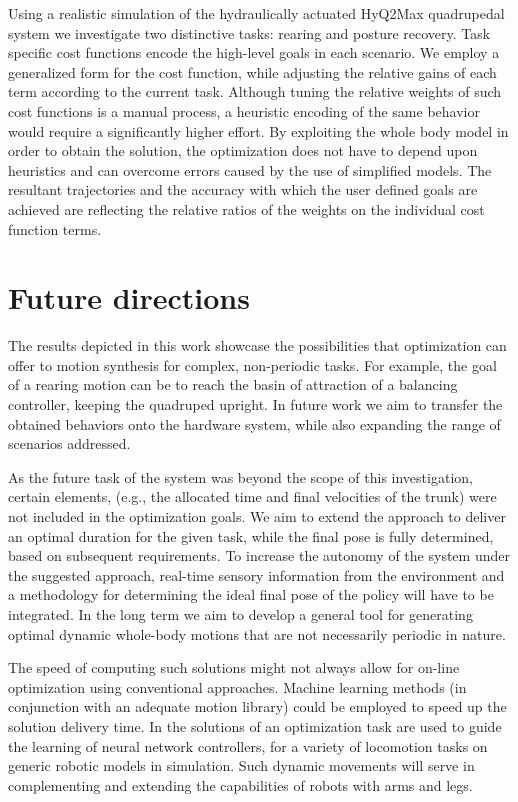 \documentclass[usletter, 10pt, conference]{ieeeconf}      %
\begin{document}
Using a realistic simulation of the hydraulically actuated HyQ2Max quadrupedal system 
we investigate two distinctive tasks: rearing and posture recovery. Task specific
cost functions encode the high-level goals in each scenario. We employ a
generalized form for the cost function, while adjusting the relative gains of each term 
according to the current task. Although tuning the relative weights of such cost functions is a manual 
process, a heuristic encoding of the same behavior would require a significantly higher effort.
By exploiting the whole body model in order to obtain the solution, the optimization does not have
to depend upon heuristics and can overcome errors caused by the use of simplified models.
The resultant trajectories and the accuracy with which the user defined goals are achieved are 
reflecting the relative ratios of the weights on the individual cost function terms. 

\section{Future directions}

The results depicted in this work showcase the possibilities that optimization 
can offer to motion synthesis for complex, non-periodic tasks. For example, the goal of a rearing 
motion can be to reach the basin of attraction of a balancing controller, 
keeping the quadruped upright. In future work we aim to transfer the obtained 
behaviors onto the hardware system, while also expanding the 
range of scenarios addressed.

As the future task of the system was beyond the scope of this investigation, certain elements,
(e.g., the allocated time and final velocities of the trunk) were not included in the
optimization goals. We aim to extend the approach to deliver an
optimal duration for the given task, while the final pose is fully determined, based on
subsequent requirements. To increase the autonomy of the system under the suggested approach, real-time 
sensory information from the environment and a methodology for determining 
the ideal final pose of the policy will have to be integrated. 
In the long term we aim to develop a general tool for generating optimal dynamic 
whole-body motions that are not necessarily periodic in nature.

The speed of computing such solutions might not always allow for on-line
optimization using conventional approaches. Machine learning methods (in conjunction with an adequate motion library)
could be employed to speed up the solution delivery time. 
In \cite{mordatch2014combining} the solutions of an optimization task are 
used to guide the learning of neural network controllers, for a variety of 
locomotion tasks on generic robotic models in simulation. Such dynamic 
movements will serve in complementing and extending the capabilities of robots 
with arms and legs.
\end{document}
